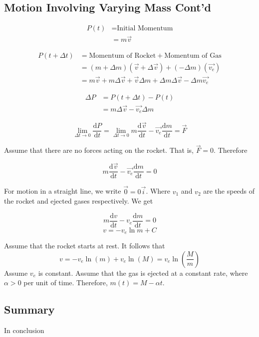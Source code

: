 \documentclass[11pt]{article}
\theoremstyle{plain} %
\theoremstyle{definition}
\theoremstyle{example}
\theoremstyle{remark}
\begin{document}
\subsection{Motion Involving Varying Mass Cont'd}

\begin{align*}
	P(t) &= \text{Initial Momentum}\\
		&= m \vec{v}
\end{align*}

\begin{align*}
	P(t + \Delta t) &= \text{Momentum of Rocket} + \text{Momentum of Gas}\\
	&= (m+ \Delta m) (\vec{v}+ \Delta \vec{v}) + (-\Delta m)(\vec{v_e})\\
	&= m \vec{v} + m \Delta \vec{v} + \vec{v} \Delta m + \Delta m \Delta \vec{v} - \Delta m \vec{v_e} 
\end{align*}

\begin{align*}
	\Delta P &= P(t + \Delta t) - P(t)\\
	&= m \Delta \vec{v} - \vec{v_e}\Delta m
\end{align*}

$$\lim_{\Delta t \to 0} \frac{\mathrm d P}{\mathrm d t} = \lim_{\Delta t \to 0} m\frac{\mathrm d \vec{v}}{\mathrm d t } - \vec{v_e} \frac{\mathrm d m}{\mathrm d t} = \vec{F}$$

Assume that there are no forces acting on the rocket. That is, $\vec{F} = 0$. Therefore

$$m\frac{\mathrm d \vec{v}}{\mathrm d t } - \vec{v_e} \frac{\mathrm d m}{\mathrm d t} = 0$$

For motion in a straight line, we write $\vec{0} = 0\vec{i}$. Where $v_1$ and $v_2$ are the speeds of the rocket and ejected gases respectively. We get 

$$m \frac{\mathrm d v }{\mathrm d t} - v_e\frac{\mathrm d m}{\mathrm d t} = 0$$
$$v = - v_e \ln{m} + C$$

Assume that the rocket starts at rest. 
It follows that $$v = -v_e \ln(m) + v_e \ln(M) = v_e \ln \left({\frac{M}{m}}\right)$$
Assume $v_e$ is constant.
Assume that the gas is ejected at a constant rate, where $\alpha > 0$ per unit of time. Therefore, $m(t) = M - \alpha t$.

\subsection{Summary}

In conclusion
\end{document}
